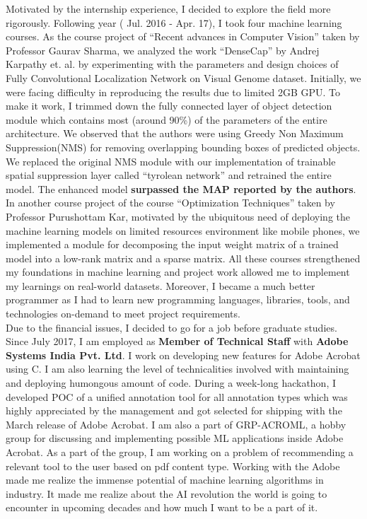 \documentclass[letterpaper]{article}
\newcommand{\CC}{C\nolinebreak\hspace{-.05em}\raisebox{.4ex}{\tiny\bf +}\nolinebreak\hspace{-.10em}\raisebox{.4ex}{\tiny\bf +}}
\def\CC{{C\nolinebreak[4]\hspace{-.05em}\raisebox{.4ex}{\tiny\bf ++}}}
\begin{document}
Motivated by the internship experience, I decided to explore the field more rigorously. Following year ( Jul. 2016 - Apr. 17), I took four machine learning courses. As the course project of “Recent advances in Computer Vision” taken by Professor Gaurav Sharma, we analyzed the work “DenseCap” by Andrej Karpathy et. al. by experimenting with the parameters and design choices of Fully Convolutional Localization Network on Visual Genome dataset. Initially, we were facing difficulty in reproducing the results due to limited 2GB GPU. To make it work, I trimmed down the fully connected layer of object detection module which contains most (around 90\%) of the parameters of the entire architecture. We observed that the authors were using Greedy Non Maximum Suppression(NMS) for removing overlapping bounding boxes of predicted objects. We replaced the original NMS module with our implementation of trainable spatial suppression layer called ``tyrolean network'' and retrained the entire model. The enhanced model \textbf{surpassed the MAP reported by the authors}. In another course project of the course ``Optimization Techniques'' taken by Professor Purushottam Kar, motivated by the ubiquitous need of deploying the machine learning models on limited resources environment like mobile phones,  we implemented a module for decomposing the input weight matrix of a trained model into a low-rank matrix and a sparse matrix. All these courses strengthened my foundations in machine learning and project work allowed me to implement my learnings on real-world datasets. Moreover, I became a much better programmer as I had to learn new programming languages, libraries, tools, and technologies on-demand to meet project requirements.\\

Due to the financial issues, I decided to go for a job before graduate studies. Since July 2017, I am employed as \textbf{Member of Technical Staff} with \textbf{Adobe Systems India Pvt. Ltd}. I work on developing new features for Adobe Acrobat using \CC. I am also learning the level of technicalities involved with maintaining and deploying humongous amount of code. During a week-long hackathon, I developed POC of a unified annotation tool for all annotation types which was highly appreciated by the management and got selected for shipping with the March release of Adobe Acrobat. I am also a part of GRP-ACROML, a hobby group for discussing and implementing possible ML applications inside Adobe Acrobat. As a part of the group, I am working on a problem of recommending a relevant tool to the user based on pdf content type. Working with the Adobe made me realize the immense potential of machine learning algorithms in industry. It made me realize about the AI revolution the world is going to encounter in upcoming decades and how much I want to be a part of it.\\
\end{document}
